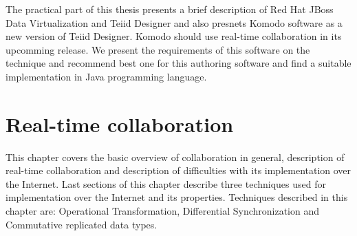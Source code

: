 \documentclass[12pt,oneside]{fithesis2}
\begin{document}
\par The practical part of this thesis presents a brief description of Red Hat JBoss Data Virtualization and Teiid Designer and also presnets Komodo software as a new version of Teiid Designer. Komodo should use real-time collaboration in its upcomming release. We present the requirements of this software on the technique and recommend best one for this authoring software and find a suitable implementation in Java programming language.

\chapter{Real-time collaboration}
This chapter covers the basic overview of collaboration in general, description of real-time collaboration and description of difficulties with its implementation over the Internet. Last sections of this chapter describe three techniques used for implementation over the Internet and its properties. Techniques described in this chapter are: Operational Transformation, Differential Synchronization and Commutative replicated data types.
\end{document}
